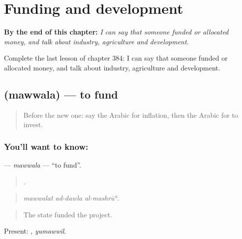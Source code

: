 
\chapter{Funding and development}
\label{ch:ar-funding-and-development}

\begin{chapteropening}
\textbf{By the end of this chapter:} \emph{I can say that someone funded or allocated money, and talk about industry, agriculture and development.}

Complete the last lesson of chapter 384: I can say that someone funded or allocated money, and talk about industry, agriculture and development.
\end{chapteropening}

\section[\texorpdfstring{\ar{مول} (mawwala)}{مول (mawwala)}]{ (mawwala) — to fund}

\label{lesson:AR-C384-mawwala}



\begin{quote}
Before the new one: say the Arabic for inflation, then the Arabic for to invest.
\end{quote}

\subsection*{You'll want to know: }
\textbf{} — \emph{mawwala} — \textquotedblleft{}to fund\textquotedblright{}.

\begin{quote}
  .
\end{quote}

\begin{quote}
\emph{mawwalat ad-dawla al-mashrūʿ.}
\end{quote}

\begin{quote}
The state funded the project.
\end{quote}

Present: , \emph{yumawwil}.

